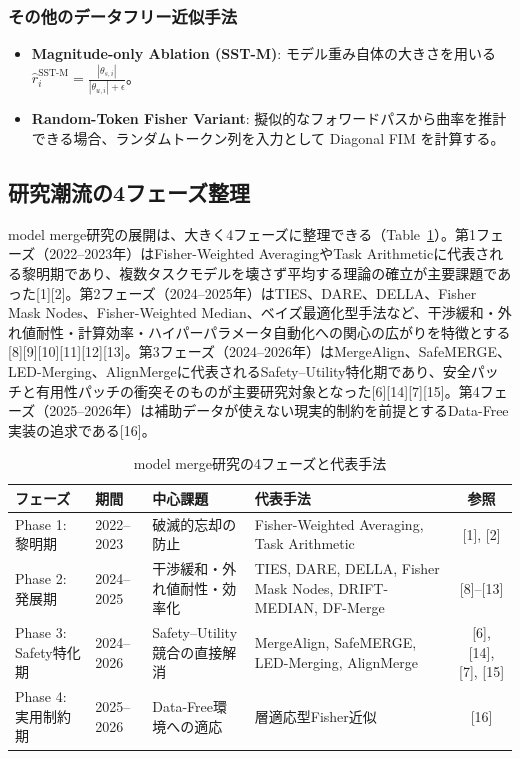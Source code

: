 \subsubsection{その他のデータフリー近似手法}
\begin{itemize}
    \item \textbf{Magnitude-only Ablation (SST-M)}: モデル重み自体の大きさを用いる $\hat{r}_i^{\text{SST-M}} = \frac{|\theta_{s,i}|}{|\theta_{u,i}| + \epsilon}$。
    \item \textbf{Random-Token Fisher Variant}: 擬似的なフォワードパスから曲率を推計できる場合、ランダムトークン列を入力として Diagonal FIM を計算する。
\end{itemize}

\subsection{研究潮流の4フェーズ整理}

model merge研究の展開は、大きく4フェーズに整理できる（Table~\ref{tab:merge-phases}）。第1フェーズ（2022–2023年）はFisher-Weighted AveragingやTask Arithmeticに代表される黎明期であり、複数タスクモデルを壊さず平均する理論の確立が主要課題であった[1][2]。第2フェーズ（2024–2025年）はTIES、DARE、DELLA、Fisher Mask Nodes、Fisher-Weighted Median、ベイズ最適化型手法など、干渉緩和・外れ値耐性・計算効率・ハイパーパラメータ自動化への関心の広がりを特徴とする[8][9][10][11][12][13]。第3フェーズ（2024–2026年）はMergeAlign、SafeMERGE、LED-Merging、AlignMergeに代表されるSafety–Utility特化期であり、安全パッチと有用性パッチの衝突そのものが主要研究対象となった[6][14][7][15]。第4フェーズ（2025–2026年）は補助データが使えない現実的制約を前提とするData-Free実装の追求である[16]。
\begin{table}[htbp]
\centering
\caption{model merge研究の4フェーズと代表手法}
\label{tab:merge-phases}
\small
\begin{tabular}{p{2.3cm}p{1.8cm}p{3.2cm}p{5.2cm}c}
\toprule
フェーズ & 期間 & 中心課題 & 代表手法 & 参照 \\
\midrule
Phase 1: 黎明期 & 2022--2023 & 破滅的忘却の防止 & Fisher-Weighted Averaging, Task Arithmetic & [1], [2] \\

Phase 2: 発展期 & 2024--2025 & 干渉緩和・外れ値耐性・効率化 & TIES, DARE, DELLA, Fisher Mask Nodes, DRIFT-MEDIAN, DF-Merge & [8]--[13] \\

Phase 3: Safety特化期 & 2024--2026 & Safety--Utility競合の直接解消 & MergeAlign, SafeMERGE, LED-Merging, AlignMerge & [6], [14], [7], [15] \\

Phase 4: 実用制約期 & 2025--2026 & Data-Free環境への適応
& 層適応型Fisher近似 & [16] \\
\bottomrule
\end{tabular}
\end{table}


